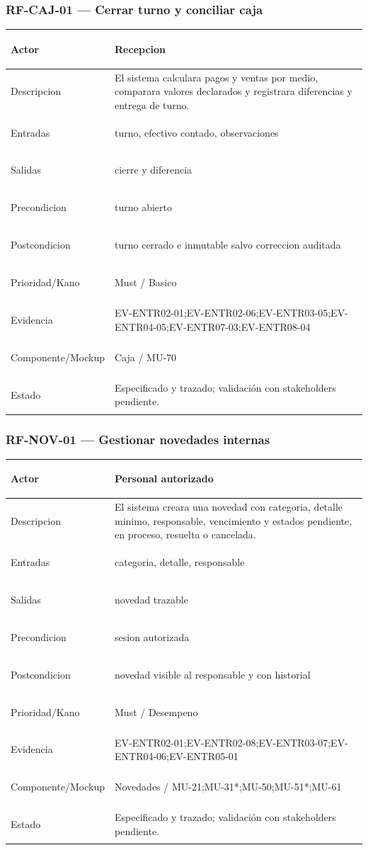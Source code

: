 \documentclass[11pt,a4paper,twoside]{article}
\begin{document}
\subsubsection{RF-CAJ-01 — Cerrar turno y conciliar caja}
\begingroup
\renewcommand{\arraystretch}{1.12}
\setlength{\tabcolsep}{5pt}
\begin{tabularx}{\textwidth}{|>{\bfseries\raggedright\arraybackslash}p{3.35cm}|>{\raggedright\arraybackslash}X|}
\hline
Actor & Recepcion \\ \hline
Descripcion & El sistema calculara pagos y ventas por medio, comparara valores declarados y registrara diferencias y entrega de turno. \\ \hline
Entradas & turno, efectivo contado, observaciones \\ \hline
Salidas & cierre y diferencia \\ \hline
Precondicion & turno abierto \\ \hline
Postcondicion & turno cerrado e inmutable salvo correccion auditada \\ \hline
Prioridad/Kano & Must / Basico \\ \hline
Evidencia & EV-ENTR02-01;EV-ENTR02-06;EV-ENTR03-05;EV-ENTR04-05;EV-ENTR07-03;EV-ENTR08-04 \\ \hline
Componente/Mockup & Caja / MU-70 \\ \hline
Estado & Especificado y trazado; validación con stakeholders pendiente. \\ \hline
\end{tabularx}
\endgroup

\subsubsection{RF-NOV-01 — Gestionar novedades internas}
\begingroup
\renewcommand{\arraystretch}{1.12}
\setlength{\tabcolsep}{5pt}
\begin{tabularx}{\textwidth}{|>{\bfseries\raggedright\arraybackslash}p{3.35cm}|>{\raggedright\arraybackslash}X|}
\hline
Actor & Personal autorizado \\ \hline
Descripcion & El sistema creara una novedad con categoria, detalle minimo, responsable, vencimiento y estados pendiente, en proceso, resuelta o cancelada. \\ \hline
Entradas & categoria, detalle, responsable \\ \hline
Salidas & novedad trazable \\ \hline
Precondicion & sesion autorizada \\ \hline
Postcondicion & novedad visible al responsable y con historial \\ \hline
Prioridad/Kano & Must / Desempeno \\ \hline
Evidencia & EV-ENTR02-01;EV-ENTR02-08;EV-ENTR03-07;EV-ENTR04-06;EV-ENTR05-01 \\ \hline
Componente/Mockup & Novedades / MU-21;MU-31*;MU-50;MU-51*;MU-61 \\ \hline
Estado & Especificado y trazado; validación con stakeholders pendiente. \\ \hline
\end{tabularx}
\endgroup
\end{document}

